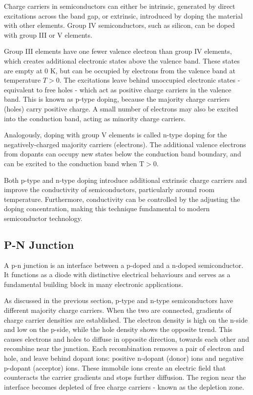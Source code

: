 Charge carriers in semiconductors can either be intrinsic, generated by direct excitations across the band gap, or extrinsic, introduced by doping the material with other elements. Group IV semiconductors, such as silicon, can be doped with group III or V elements. 

Group III elements have one fewer valence electron than group IV elements, which creates additional electronic states above the valence band. These states are empty at 0 K, but can be occupied by electrons from the valence band at temperature $T>$0. The excitations leave behind unoccupied electronic states - equivalent to free holes - which act as positive charge carriers in the valence band. This is known as p-type doping, because the majority charge carriers (holes) carry positive charge. A small number of electrons may also be excited into the conduction band, acting as minority charge carriers.

Analogously, doping with group V elements is called n-type doping for the negatively-charged majority carriers (electrons). The additional valence electrons from dopants can occupy new states below the conduction band boundary, and can be excited to the conduction band when T$>$0. 

Both p-type and n-type doping introduce additional extrinsic charge carriers and improve the conductivity of semiconductors, particularly around room temperature. Furthermore, conductivity can be controlled by the adjusting the doping concentration, making this technique fundamental to modern semiconductor technology. 


\subsection{P-N Junction}
A p-n junction is an interface between a p-doped and a n-doped semiconductor. It functions as a diode with distinctive electrical behaviours and serves as a fundamental building block in many electronic applications. 

As discussed in the previous section, p-type and n-type semiconductors have different majority charge carriers. When the two are connected, gradients of charge carrier densities are established. The electron density is high on the n-side and low on the p-side, while the hole density shows the opposite trend. This causes electrons and holes to diffuse in opposite direction, towards each other and recombine near the junction. Each recombination removes a pair of electron and hole, and leave behind dopant ions: positive n-dopant (donor) ions and negative p-dopant (acceptor) ions. These immobile ions create an electric field that counteracts the carrier gradients and stops further diffusion. The region near the interface becomes depleted of free charge carriers - known as the depletion zone.


